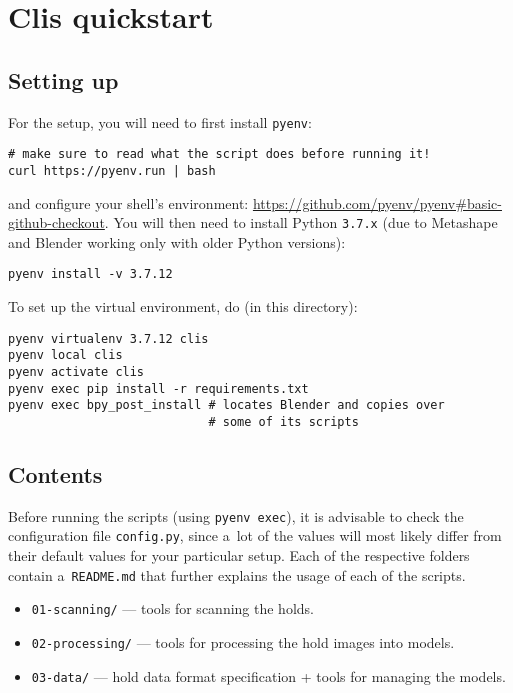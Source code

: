 \chapter{Clis quickstart}\label{apx:clis}

\section{Setting up}\label{apx:clissetup}

For the setup, you will need to first install \texttt{pyenv}:
\begin{verbatim}
# make sure to read what the script does before running it!
curl https://pyenv.run | bash
\end{verbatim}
and configure your shell's environment: \url{https://github.com/pyenv/pyenv\#basic-github-checkout}.
You will then need to install Python \texttt{3.7.x} (due to Metashape and Blender working only with older Python versions):

\begin{verbatim}
pyenv install -v 3.7.12
\end{verbatim}
To set up the virtual environment, do (in this directory):
\begin{verbatim}
pyenv virtualenv 3.7.12 clis
pyenv local clis
pyenv activate clis
pyenv exec pip install -r requirements.txt
pyenv exec bpy_post_install # locates Blender and copies over
                            # some of its scripts
\end{verbatim}

\section{Contents}

Before running the scripts (using \texttt{pyenv exec}), it is advisable
to check the configuration file \texttt{config.py}, since a~lot of the values will most likely
differ from their default values for your particular setup. Each of the
respective folders contain a~\texttt{README.md} that further explains
the usage of each of the scripts.

\begin{itemize}
	\item \texttt{01-scanning/} --- tools for scanning the holds.
	\item \texttt{02-processing/} --- tools for processing the hold images into models.
	\item \texttt{03-data/} --- hold data format specification + tools for managing the models.
\end{itemize}

